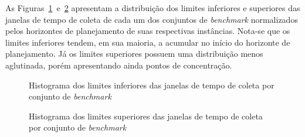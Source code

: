 
As Figuras~\ref{fig:hist_pickup_lower_tw}~e~\ref{fig:hist_pickup_upper_tw} 
apresentam a distribuição dos limites inferiores e superiores das janelas de 
tempo de coleta de cada um dos conjuntos de \textit{benchmark} normalizados 
pelos horizontes de planejamento de suas respectivas instâncias.
Nota-se que os limites inferiores tendem, em sua maioria, a acumular no início 
do horizonte de planejamento.
Já os limites superiores possuem uma distribuição menos aglutinada, 
porém apresentando ainda pontos de concentração.

\begin{figure}[h]
    \centering
    \caption{Histograma dos limites inferiores das janelas de tempo 
             de coleta por conjunto de \textit{benchmark}}
    \label{fig:hist_pickup_lower_tw}
\end{figure}

\begin{figure}[h]
    \centering
    \caption{Histograma dos limites superiores das janelas de tempo de 
             coleta por conjunto de \textit{benchmark}}
    \label{fig:hist_pickup_upper_tw}
\end{figure}

